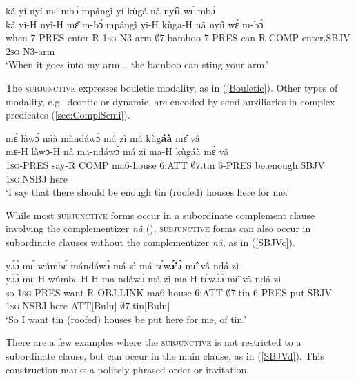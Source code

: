 \begin{exe} 
\ex\label{SBJVa}
  \glll    ká yí nyí mɛ̂ mbɔ̀ mpángì yí kùgá nâ ny{\bfseries íì} wɛ̀ mbɔ̀\\
           ká yi-H nyî-H mɛ̂ m-bɔ̀ mpángì yi-H kùga-H nâ nyíì wɛ̀ m-bɔ̀ \\
             when 7-PRES enter-R 1\textsc{sg} N3-arm $\emptyset$7.bamboo 7-PRES can-R COMP enter.SBJV 2\textsc{sg} N3-arm  \\
    \trans `When it goes into my arm... the bamboo can sting your arm.'
\end{exe}

The \textsc{subjunctive} expresses bouletic modality, as in (\ref{Bouletic}). Other types of modality, e.g.\ deontic or dynamic, are encoded by semi-auxiliaries in complex predicates (\ref{sec:ComplSemi}).

\begin{exe} 
\ex\label{Bouletic} 
  \glll  mɛ́ làwɔ́ náà màndáwɔ̀ má zì má kùg{\bfseries áà} mɛ̂ vâ\\
         mɛ-H làwɔ-H nâ ma-ndáwɔ̀ má zì ma-H kùgáà mɛ̀ vâ \\
            1\textsc{sg}-PRES say-R COMP ma6-house 6:ATT $\emptyset$7.tin 6-PRES be.enough.SBJV 1\textsc{sg}.NSBJ here \\
    \trans `I say that there should be enough tin (roofed) houses here for me.'
\end{exe}


\noindent While most \textsc{subjunctive} forms occur in a subordinate complement clause involving the complementizer {\itshape nâ} (), \textsc{subjunctive} forms can also occur  in subordinate clauses without the complementizer {\itshape nâ}, as in (\ref{SBJVc}).

\begin{exe} 
\ex\label{SBJVc}
  \glll     yɔ́ɔ̀ mɛ́ wúmbɛ́ mándáwɔ̀ má zì má tɛ́w{\bfseries ɔ́'ɔ̀} mɛ̂ vâ ndá zì \\
            yɔ́ɔ̀ mɛ-H wúmbɛ-H H-ma-ndáwɔ̀ má zì ma-H tɛ́wɔ̀ɔ̀ mɛ̂ vâ ndá zì \\
              so 1\textsc{sg}-PRES want-R OBJ.LINK-ma6-house 6:ATT $\emptyset$7.tin 6-PRES put.SBJV 1\textsc{sg}.NSBJ here ATT[Bulu] $\emptyset$7.tin[Bulu]\\
    \trans `So I want tin (roofed) houses be put here for me, of tin.'
\end{exe}

There are a few examples where the \textsc{subjunctive} is not restricted to a subordinate clause, but can occur in the main clause, as in (\ref{SBJVd}). This construction marks a politely phrased order or invitation.


